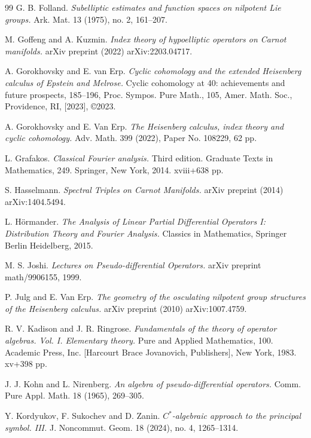 \documentclass[leqno]{amsart}
\begin{document}
\begin{thebibliography}{99}
G. B. Folland. 
{\it Subelliptic estimates and function spaces on nilpotent Lie groups.} 
Ark. Mat. 13 (1975), no. 2, 161--207.

M. Goffeng and A. Kuzmin.
{\it Index theory of hypoelliptic operators on Carnot manifolds.}
arXiv preprint (2022) arXiv:2203.04717.

A. Gorokhovsky and E. van Erp. 
{\it Cyclic cohomology and the extended Heisenberg calculus of Epstein and Melrose.} Cyclic cohomology at 40: achievements and future prospects, 185--196, Proc. Sympos. Pure Math., 105, Amer. Math. Soc., Providence, RI, [2023], ©2023.

A. Gorokhovsky and E. Van Erp.
{\it The Heisenberg calculus, index theory and cyclic cohomology.} 
Adv. Math. 399 (2022), Paper No. 108229, 62 pp.

L. Grafakos. 
{\it Classical Fourier analysis.} 
Third edition. Graduate Texts in Mathematics, 249. Springer, New York, 2014. xviii+638 pp.


S. Hasselmann.
{\it Spectral Triples on Carnot Manifolds.}
arXiv preprint (2014) arXiv:1404.5494.

L. H{\"o}rmander.
{\it The Analysis of Linear Partial Differential Operators I: Distribution Theory and Fourier Analysis.}
Classics in Mathematics, Springer Berlin Heidelberg, 2015.

M. S. Joshi.
{\it Lectures on Pseudo-differential Operators.}
arXiv preprint math/9906155, 1999.

P. Julg and E. Van Erp.
{\it The geometry of the osculating nilpotent group structures of the Heisenberg calculus.}
arXiv preprint (2010) arXiv:1007.4759.

R. V. Kadison and J. R. Ringrose. 
{\it Fundamentals of the theory of operator algebras. Vol. I. Elementary theory.} 
Pure and Applied Mathematics, 100. Academic Press, Inc. [Harcourt Brace Jovanovich, Publishers], New York, 1983. xv+398 pp.

J. J. Kohn and L. Nirenberg. 
{\it An algebra of pseudo-differential operators.} 
Comm. Pure Appl. Math. 18 (1965), 269--305.

Y. Kordyukov, F. Sukochev and D. Zanin. 
{\it $C^{\ast}$-algebraic approach to the principal symbol. III.} 
J. Noncommut. Geom. 18 (2024), no. 4, 1265--1314.


\end{thebibliography}
\end{document}
